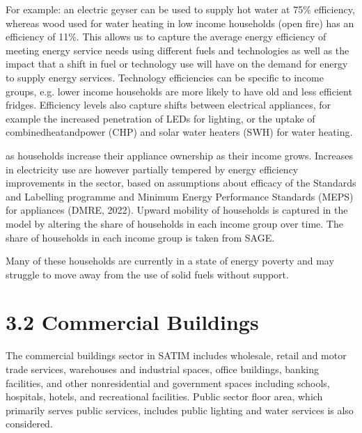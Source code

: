 \documentclass[letterpaper,10pt,english]{jupyterBook}
\begin{document}
\sphinxAtStartPar
{} For example: an electric geyser can be used to supply hot water at 75\% efficiency, whereas wood used for water heating in low income households (open fire) has an efficiency of 11\%. This allows us to capture the average energy efficiency of meeting energy service needs using different fuels and technologies as well as the impact that a shift in fuel or technology use will have on the demand for energy to supply energy services. Technology efficiencies can be specific to income groups, e.g. lower income households are more likely to have old and less efficient fridges. Efficiency levels also capture shifts between electrical appliances, for example the increased penetration of LEDs for lighting, or the uptake of combined\sphinxhyphen{}heat\sphinxhyphen{}and\sphinxhyphen{}power (CHP) and solar water heaters (SWH) for water heating.

\sphinxAtStartPar
{} as households increase their appliance ownership as their income grows. Increases in electricity use are however partially tempered by energy efficiency improvements in the sector, based on assumptions about efficacy of the Standards and Labelling programme and Minimum Energy Performance Standards (MEPS) for appliances (DMRE, 2022). Upward mobility of households is captured in the model by altering the share of households in each income group over time. The share of households in each income group is taken from SAGE.

\sphinxAtStartPar
{} Many of these households are currently in a state of energy poverty and may struggle to move away from the use of solid fuels without support.


\section{3.2 Commercial Buildings}
\label{\detokenize{03Energydemand:commercial-buildings}}
\sphinxAtStartPar
The commercial buildings sector in SATIM includes wholesale, retail and motor trade services, warehouses and industrial spaces, office buildings, banking facilities, and other non\sphinxhyphen{}residential and government spaces including schools, hospitals, hotels, and recreational facilities. Public sector floor area, which primarily serves public services, includes public lighting and water services is also considered.
\end{document}
